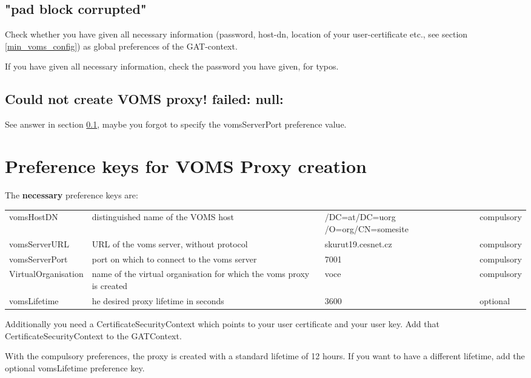 \documentclass{scrreprt}
\begin{document}
\subsection{"pad block corrupted"}\label{pad_block}

Check whether you have given all necessary information (password, host-dn, location
of your user-certificate etc., see section \ref{min_voms_config}) as global preferences of the GAT-context.

If you have given all necessary information, check the password you have given, for typos.

\subsection{Could not create VOMS proxy! failed: null:}

See answer in section \ref{pad_block}, maybe you forgot to specify the vomsServerPort preference value.

\section{Preference keys for VOMS Proxy creation}

The \textbf{necessary} preference keys are: \\

\noindent
\begin{tabular}{|l|p{4cm}|p{4cm}|l|}
\hline
vomsHostDN & distinguished name of the VOMS host & /DC=at/DC=uorg /O=org/CN=somesite & compulsory \\
vomsServerURL & URL of the voms server, without protocol & skurut19.cesnet.cz  & compulsory \\
vomsServerPort & port on which to connect to the voms server & 7001 & compulsory\\
VirtualOrganisation & name of the virtual organisation for which the voms proxy is created & voce & compulsory \\
vomsLifetime & he desired proxy lifetime in seconds & 3600 & optional \\
\hline
\end{tabular}


Additionally you need a CertificateSecurityContext which points to your user certificate and your user key.
Add that CertificateSecurityContext to the GATContext.

With the compulsory preferences, the proxy is created with a standard lifetime of 12 hours. If you want to have a different
lifetime, add the optional vomsLifetime preference key.
\end{document}
